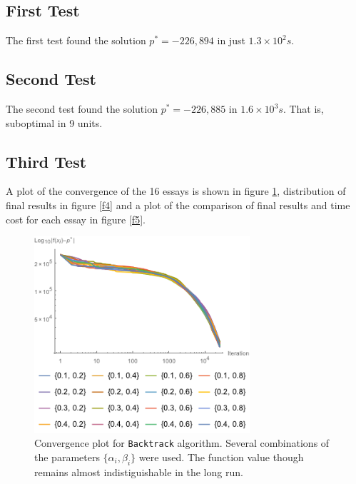 \documentclass[a4paper,8pt,twocolumn]{article}
\begin{document}
\subsection*{First Test}
The first test found the solution $p^*=-226,894$ in just $1.3\times 10^2s$.

\subsection*{Second Test}
The second test found the solution $p^*=-226,885$ in $1.6\times 10^3s$. That is, suboptimal in 9 units. 

\subsection*{Third Test}

A plot of the convergence of the 16 essays is shown in figure \ref{f3}, distribution of final results in figure \ref{f4} and a plot of the comparison of final results and time cost for each essay in figure \ref{f5}.

\begin{figure}[!ht]
\begin{center}
\includegraphics[width=8cm]{f3.png}
\caption{\footnotesize{Convergence plot for \texttt{Backtrack} algorithm. Several combinations of the parameters $\{\alpha_i,\beta_i\}$ were used. The function value though remains almost indistiguishable in the long run.}\label{f3}}
\end{center}
\end{figure}
\end{document}
